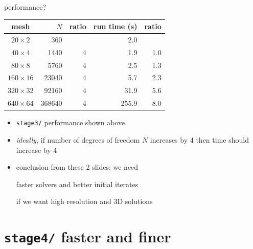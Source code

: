 \documentclass[10pt,hyperref,dvipsnames]{beamer}
\begin{document}
\begin{frame}{performance?}

\begin{center}
\begin{tabular}{c|rr|rr}
mesh           &   $N$ & ratio & run time (s)  & ratio \\ \hline
$20\times 2$   &    360 &       &          2.0 &       \\
$40\times 4$   &   1440 &     4 &          1.9 &   1.0 \\
$80\times 8$   &   5760 &     4 &          2.5 &   1.3 \\
$160\times 16$ &  23040 &     4 &          5.7 &   2.3 \\
$320\times 32$ &  92160 &     4 &         31.9 &   5.6 \\
$640\times 64$ & 368640 &     4 &        255.9 &   8.0
\end{tabular}
\end{center}

\begin{itemize}
\item \texttt{stage3/} performance shown above
\item \emph{ideally}, if number of degrees of freedom $N$ increases by 4 then time should increase by 4
\item conclusion from these 2 slides: we need

\begin{center}
\alert{faster solvers} and \alert{better initial iterates}
\end{center}

if we want high resolution and 3D solutions
\end{itemize}
\end{frame}



\section{\texttt{stage4/} \qquad faster and finer}
\end{document}
